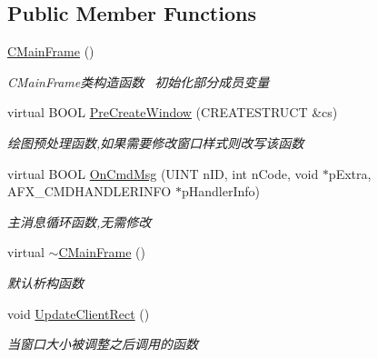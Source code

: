 \subsection*{Public Member Functions}
\begin{DoxyCompactItemize}
\item 
\hyperlink{class_c_main_frame_af3e997aeae4148d2aaa4a1e1ae7bdd53}{C\+Main\+Frame} ()
\begin{DoxyCompactList}\small\item\em C\+Main\+Frame类构造函数~\newline
初始化部分成员变量 \end{DoxyCompactList}\item 
\mbox{\label{class_c_main_frame_a549bf677c955c2898c3c683321633c16}} 
virtual B\+O\+OL \hyperlink{class_c_main_frame_a549bf677c955c2898c3c683321633c16}{Pre\+Create\+Window} (C\+R\+E\+A\+T\+E\+S\+T\+R\+U\+CT \&cs)
\begin{DoxyCompactList}\small\item\em 绘图预处理函数,如果需要修改窗口样式则改写该函数 \end{DoxyCompactList}\item 
\mbox{\label{class_c_main_frame_ade959eb0bab719bf06bb9b18ee407101}} 
virtual B\+O\+OL \hyperlink{class_c_main_frame_ade959eb0bab719bf06bb9b18ee407101}{On\+Cmd\+Msg} (U\+I\+NT n\+ID, int n\+Code, void $\ast$p\+Extra, A\+F\+X\+\_\+\+C\+M\+D\+H\+A\+N\+D\+L\+E\+R\+I\+N\+FO $\ast$p\+Handler\+Info)
\begin{DoxyCompactList}\small\item\em 主消息循环函数,无需修改 \end{DoxyCompactList}\item 
\mbox{\label{class_c_main_frame_a8ae555f23fdf97edb4feb4d3e1bfa4ee}} 
virtual \hyperlink{class_c_main_frame_a8ae555f23fdf97edb4feb4d3e1bfa4ee}{$\sim$\+C\+Main\+Frame} ()
\begin{DoxyCompactList}\small\item\em 默认析构函数 \end{DoxyCompactList}\item 
void \hyperlink{class_c_main_frame_a2500e3a6ace77e01430f5ff4b9a6f182}{Update\+Client\+Rect} ()
\begin{DoxyCompactList}\small\item\em 当窗口大小被调整之后调用的函数~\newline

\end{DoxyCompactList}
\end{DoxyCompactItemize}
